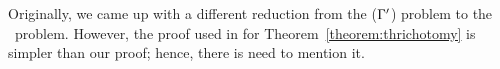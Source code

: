 Originally, we came up with a different reduction from the \ccsp(\(\Gamma'\)) problem
to the \cds\ problem. However, the proof used in \cite{Thrichotomy} for
Theorem~\ref{theorem:thrichotomy} is simpler than our proof; hence, there is need to mention it.
\begin{comment}
The reduction uses Theorem~\ref{theorem:majority} to break arbitrary relation to binary relation.
A function \(m: D^3\to D\) is said to be a \emph{majority function}, if for any \(x,y\in D\) we have
\(m(x,x,y) = m(x,y,x) = m(y, x, x) = x\)\@. We denote the projection of \mR\ on coordinates \(i\) and \(j\) by \(R_{1,2}\) and projections of \mR\ on coordinates from \(i\) to \(j\) by \(R_{i-j}\)\@.


\begin{theorem} [Bergman's Double-projection Theorem (Unpublished)]\label{theorem:majority}
Let \mR\ be a relation of arity \mn\ on domain \(D\) and
\(m\) be a majority function on the same domain.
If \mm\ is a polymorphism for \mR, then \mR\ can be expressed by all 
its binary projections as \(R(x_1,\dotsc,x_n) = \bigwedge_{i,j} R_{i,j}(x_i,x_j)\)\@.
\end{theorem}

We provide our own proof for this theorem.

\begin{proof}
It is trivial that \mR\ implies all its binary projection. We  prove that
binary projections of \mR\ implies \mR\@.
We proceed by induction on \(t\) the arity of the relation \mR\@.
For \(t=2\), the statement is trivial. We show that
if the statement is true for \(t=n-1\) it is also true for \(t=n\)\@.
We want to prove \(\bigwedge_{i,j} R_{i,j}(x_i,x_j) \implies R(x_1,\dotsc, x_n)\).
By induction hypothesis \(R_{1-(n-1)}(x_1,\dotsc,x_{n-1})\) and \(R_{2-n}(x_2,\dots,x_n)\)
is true because \(R_{1-(n-1)}\) and \(R_{2-n})\) are closed under \mm\@.
By hypothesis, \(R_{1,n}(x_1,x_n)\) is also true. Since these relations are projection of \mR,
there are \(y_1,\dotsc,y_n \in D\) such that 
\(R(x_1,\dotsc,x_{n-1},y_n)\), \(R(y_1,x_2,\dotsc,x_n)\), and \(R(x_1,y_2,\dotsc,y_{n-1},x_n)\)
are true. Since \mm\ is a polymorphism of \mR, \(R(x_1,\dotsc,x_n)\) is true.
\end{proof}

For every monotone
relation, we can find a majority projection using \(\vee\) and \(\wedge\) operators. One
example would be \(m(x,y,z)=(x \vee y) \wedge (x \vee z) \wedge (y \vee z)\)\@. 
Thus, every instance of the \ccsp(\(\relset'\)) problem can be parsimoniously reduced to
a \ccsp(\\)) instance, where \(\relset''\) is the binary monotone constraint language.
Finally, \ccsp(\(\relset''\)
\end{comment}


